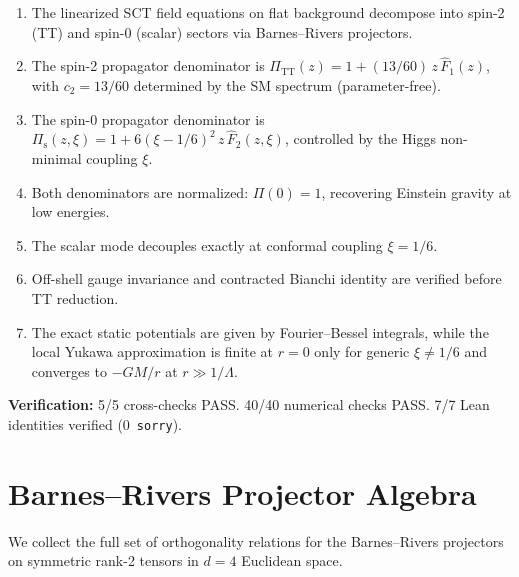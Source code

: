 \documentclass[11pt,a4paper]{article}
\theoremstyle{plain}
\theoremstyle{definition}
\begin{document}
\begin{tcolorbox}[colback=blue!5!white, colframe=blue!50!black,
  title={\textbf{NT-4a Main Results}}]
\begin{enumerate}[nosep]
  \item The linearized SCT field equations on flat background decompose
    into spin-2 (TT) and spin-0 (scalar) sectors via Barnes--Rivers
    projectors.
  \item The spin-2 propagator denominator is
    $\Pi_{\mathrm{TT}}(z) = 1 + (13/60)\,z\,\hat{F}_1(z)$,
    with $c_2 = 13/60$ determined by the SM spectrum (parameter-free).
  \item The spin-0 propagator denominator is
    $\Pi_{\mathrm{s}}(z,\xi) = 1 + 6(\xi-1/6)^2\,z\,\hat{F}_2(z,\xi)$,
    controlled by the Higgs non-minimal coupling $\xi$.
  \item Both denominators are normalized: $\Pi(0) = 1$, recovering
    Einstein gravity at low energies.
  \item The scalar mode decouples exactly at conformal coupling $\xi=1/6$.
  \item Off-shell gauge invariance and contracted Bianchi identity
    are verified before TT reduction.
  \item The exact static potentials are given by Fourier--Bessel integrals,
    while the local Yukawa approximation is finite at $r = 0$ only for
    generic $\xi \neq 1/6$ and converges to $-GM/r$ at $r \gg 1/\Lambda$.
\end{enumerate}

\medskip
\noindent\textbf{Verification:} 5/5 cross-checks PASS.
40/40 numerical checks PASS. 7/7 Lean identities verified
(0~\texttt{sorry}).
\end{tcolorbox}

\appendix
\section{Barnes--Rivers Projector Algebra}\label{app:BR}

We collect the full set of orthogonality relations for the Barnes--Rivers
projectors on symmetric rank-2 tensors in $d = 4$ Euclidean space.
\end{document}
